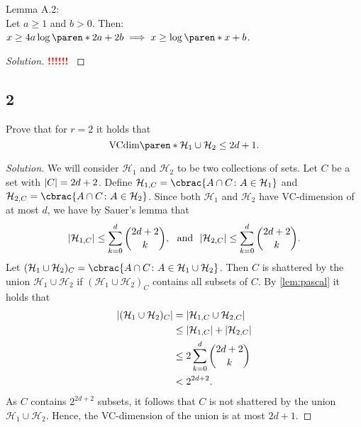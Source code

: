 \documentclass[10pt, a4paper, twoside]{amsart}
\theoremstyle{plain}
\DeclarePairedDelimiter\abs{\lvert}{\rvert}
\DeclarePairedDelimiter\cbrac\{\}
\DeclarePairedDelimiter\paren()
\renewcommand{\c}{\ensuremath{\colon}}
\newcommand{\cH}{\ensuremath{\mathcal{H}}}
\newenvironment{solution}
               {\let\oldqedsymbol=\qedsymbol
                \renewcommand{\qedsymbol}{$\blacktriangleleft$}
                \begin{proof}[Solution]}
               {\end{proof}
                \renewcommand{\qedsymbol}{\oldqedsymbol}}
\newcommand{\TODO}{\textcolor{red}{\textbf{!!!!!! }}}
\begin{document}
Lemma A.2:\\
Let $a \geq 1$ and $b>0$. Then: $x \geq 4a \log \paren*{2a} +2b \implies x \geq \log \paren*{x}+b$.
\begin{solution}
\TODO
\end{solution}
\subsection*{2}
Prove that for $r = 2$ it holds that
\begin{equation*}
  \text{VCdim}\paren*{\cH_1 \cup \cH_2}\leq 2d +1.
\end{equation*}
\begin{solution}
We will consider $\cH_1$ and $\cH_2$ to be two collections of sets.
Let $C$ be a set with $\abs{C}=2d+2$. Define $\cH_{1,C}=\cbrac{A \cap C \c A \in \cH_1}$
and $\cH_{2,C}=\cbrac{A \cap C \c A \in \cH_2}$. 
Since both $\cH_1$ and $\cH_2$ have VC-dimension of at most $d$, we have by Sauer's lemma that 
\begin{equation*}
 \abs{\cH_{1,C}} \leq \sum_{k=0}^{d}\binom{2d+2}{k}, \ \text{ and } \ \abs{\cH_{2,C}} \leq \sum_{k=0}^{d}\binom{2d+2}{k}.
\end{equation*}
Let $(\cH_{1}\cup \cH_{2})_C=\cbrac{A \cap C \c A \in \cH_1 \cup \cH_2}$. Then $C$ is shattered by the union $\cH_1 \cup \cH_2$
if $(\cH_{1}\cup \cH_{2})_C$ contains all subsets of $C$.
By \cref{lem:pascal} it holds that
\begin{align*}
 \abs{(\cH_{1}\cup \cH_{2})_C} &= \abs{\cH_{1,C} \cup \cH_{2,C}} \\
 &\leq \abs{\cH_{1,C}} + \abs{\cH_{2,C}} \\
 &\leq 2\sum_{k=0}^{d}\binom{2d+2}{k} \\
 &< 2^{2d+2}.
\end{align*}
As $C$ contains $2^{2d+2}$ subsets, it follows that $C$ is not shattered by the union $\cH_1 \cup \cH_2$.
Hence, the VC-dimension of the union is at most $2d+1$.
\end{solution}
\end{document}
